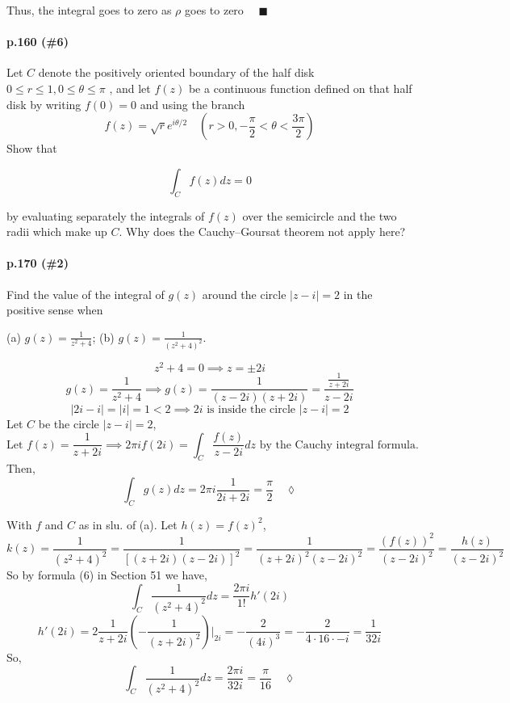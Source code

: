 \documentclass{article}
\begin{document}
Thus, the integral goes to zero as $\rho$ goes to zero $\quad \blacksquare$


\paragraph{p.160 \color{blue}(\#6)\color{black}}

Let $C$ denote the positively oriented boundary of the half disk$ 0
\leq r \leq 1, 0 \leq  θ \leq \pi$ ,
and let $f (z)$ be a continuous function defined on that half disk by writing $f (0) = 0$
and using the branch
\[f(z) = \sqrt{r} e^{i\theta/2}\quad \left( r> 0, -\frac{\pi}{2} <
    \theta <\frac{3\pi}{2} \right)\]
 Show that

 \[\int_C f (z) dz = 0\]

by evaluating separately the integrals of $f (z)$ over the semicircle and the two radii
which make up $C$. Why does the Cauchy–Goursat theorem not apply here?

\paragraph{p.170 (\#2)}

Find the value of the integral of $g(z)$ around the circle $|z − i| = 2$ in the positive sense
when

(a) $g(z) =\frac{1}{z^2+4}$;\hspace{0.618em}
(b) $g(z) = \frac{1}{(z^2 + 4)^2}.$


\[z^2+4 = 0 \implies z = \pm 2 i\]
\[g(z) =\frac{1}{z^2+4} \implies g(z) = \frac{1}{(z-2i)(z+2i)} = \frac{\frac{1}{z+2i}}{z-2i}\]
\[|2i-i| = |i| = 1 < 2 \implies 2i \text{ is inside the circle }|z -
  i| =2\]
Let $C$ be the circle $|z - i| =2$,
\[\text{Let } f(z) =  \frac{1}{z+2i} \implies  2\pi if(2i) = \int_C
  \frac{f(z)}{z-2i} dz \text{ by the Cauchy integral formula.}\]
Then,\[\int_C g(z) dz = 2\pi i\frac{1}{2i+2i}= \frac{\pi}{2}\quad
  \lozenge\]


With $f$ and $C$ as in slu. of (a). Let $h(z) = f(z)^2$,
\[k(z) = \frac{1}{(z^2+4)^2} = \frac{1}{[(z+2i)(z-2i)]^2}= \frac{1}{(z+2i)^2(z-2i)^2} =  \frac{(f(z))^2}{(z-2i)^2} = \frac{h(z)}{(z-2i)^2}\]
So by formula (6) in Section 51 we have,
\[\int_C  \frac{1}{(z^2+4)^2} dz = \frac{2\pi i}{1!}h'(2i)\]
\[h'(2i) = 2\frac{1}{z+2i}(-\frac{1}{(z+2i)^2})|_{2i} =
  -\frac{2}{(4i)^3} = -\frac{2}{4\cdot 16\cdot-i}= \frac{1}{32i}\]
So, \[\int_C  \frac{1}{(z^2+4)^2} dz = \frac{2\pi i}{32i} =
  \frac{\pi}{16}\quad \lozenge\]
\end{document}
